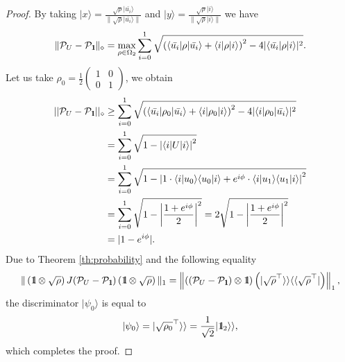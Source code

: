 \documentclass[preprint,12pt, a4paper, dvipsnames]{elsarticle}
\newcommand{\ket}[1]{\ensuremath{|#1\rangle}}
\newcommand{\bra}[1]{\ensuremath{\langle#1|}}
\newcommand{\braket}[2]{\ensuremath{\langle{#1}|{#2}\rangle}}
\newcommand{\1}{{\rm 1\hspace{-0.9mm}l}}
\newcommand{\Id}{{\rm 1\hspace{-0.9mm}l}}
\newcommand{\PP}{\mathcal{P}}
\theoremstyle{definition}
\begin{document}
\begin{proof}
	By taking $\ket{x} = \frac{\sqrt{\rho} \ket{\bar{u_i}}}{\| \sqrt{\rho}
		\ket{\bar{u_i}} \|}$ and $ \ket{y} = \frac{\sqrt{\rho} \ket{i}}{\|\sqrt{\rho}
		\ket{i} \|}$ we have
	\begin{equation}
	\| \PP_{U} - \PP_{\Id}  \|_\diamond  = \max_{\rho \in \Omega_2}
	\sum_{i=0}^{1} \sqrt{\left( \bra{\bar{u_i}} \rho \ket{\bar{u_i}} + \bra{i} \rho \ket{i
		}\right)^2 - 4 | \bra{\bar{u_i}} \rho \ket{i} |^2}.
	\end{equation}
	Let us take  $\rho_0 =   \frac{1}{2}
	\left(\begin{array}{cc}1&0\\0&1\end{array}\right)  $,   we obtain
	\begin{equation}
	\begin{split}
	||\mathcal{P}_U - \mathcal{P}_{\1}||_\diamond
	&\ge \sum_{i=0}^1
	\sqrt{\left(\bra{\bar{u_i}}\rho_0\ket{\bar{u_i}} + \bra{i} \rho_0 \ket{i} \right)^2 -
		4|\bra{i}\rho_0\ket{\bar{u_i}}|^2}  \\
	&= \sum_{i=0}^1  \sqrt{ 1 -  \left| \bra{i}  U \ket{i }\right|^2}
	\\
	&=\sum_{i=0}^1  \sqrt{1 -  \left| 1 \cdot \braket{i}{u_0}
		\braket{u_0}{i} + e^{i \phi} \cdot\braket{i}{u_1} \braket{u_1}{i}\right|^2} \\
	&= \sum_{i=0}^1
	\sqrt{1 -\left| \frac{1+ e^{i \phi}}{2}\right|^2 }
	= 2 \sqrt{1 -\left| \frac{1+e^{i \phi}}{2}\right|^2 } \\
	&= |1-e^{i \phi }|.
	\end{split}
	\end{equation}
	Due to Theorem \ref{th:probability} and the following equality
	\begin{equation}
	\begin{split}
 \| \left( \Id \otimes \sqrt{\rho} \right) J(\PP_{U} - \PP_{\Id} )  \left(
	\Id \otimes \sqrt{\rho} \right) \|_1 = \left\| ( (\PP_{U} - \PP_\Id) \otimes \Id) \left(  | \sqrt{\rho}^\top
	\rangle \rangle \langle \langle \sqrt{\rho}^\top | \right) \right\|_1,
	\end{split}
	\end{equation}
the discriminator $\ket{\psi_0}$
 is equal to  \begin{equation}
	\ket{\psi_{0}} =  | \sqrt{\rho_0}^\top
	\rangle \rangle  = \frac{1}{\sqrt{2} } |
	\Id_2 \rangle \rangle,
	\end{equation}
	which completes the proof.
\end{proof}
\end{document}
